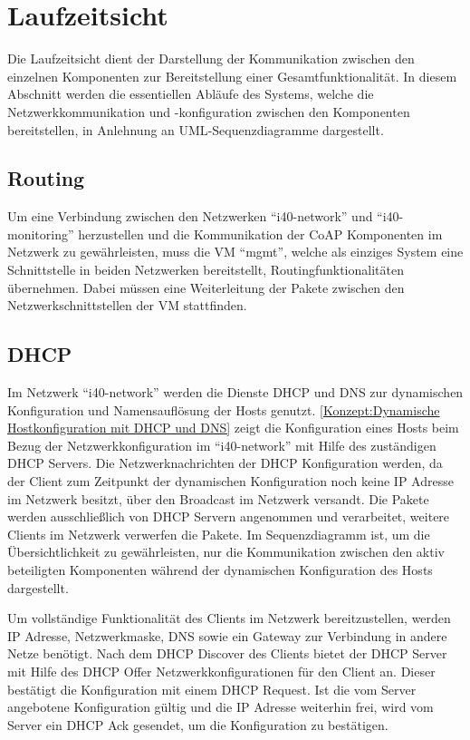 \section{Laufzeitsicht}
Die Laufzeitsicht dient der Darstellung der Kommunikation zwischen den einzelnen Komponenten zur Bereitstellung einer Gesamtfunktionalität. In diesem Abschnitt werden die essentiellen Abläufe des Systems, welche die Netzwerkkommunikation und -konfiguration zwischen den Komponenten bereitstellen, in Anlehnung an \ac{UML}-Sequenzdiagramme dargestellt.

\subsection{Routing}
Um eine Verbindung zwischen den Netzwerken "`i40-network"' und "`i40-monitoring"' herzustellen und die Kommunikation der \ac{CoAP} Komponenten im Netzwerk zu gewährleisten, muss die \ac{VM} "`mgmt"', welche als einziges System eine Schnittstelle in beiden Netzwerken bereitstellt, Routingfunktionalitäten übernehmen. Dabei müssen eine Weiterleitung der Pakete zwischen den Netzwerkschnittstellen der \ac{VM} stattfinden.

\subsection{\ac{DHCP}}
Im Netzwerk "`i40-network"' werden die Dienste \ac{DHCP} und \ac{DNS} zur dynamischen Konfiguration und Namensauflösung der Hosts genutzt. \autoref{Konzept:Dynamische Hostkonfiguration mit DHCP und DNS} zeigt die Konfiguration eines Hosts beim Bezug der Netzwerkkonfiguration im "`i40-network"' mit Hilfe des zuständigen \ac{DHCP} Servers. Die Netzwerknachrichten der \ac{DHCP} Konfiguration werden, da der Client zum Zeitpunkt der dynamischen Konfiguration noch keine \ac{IP} Adresse im Netzwerk besitzt, über den Broadcast im Netzwerk versandt. Die Pakete werden ausschließlich von \ac{DHCP} Servern angenommen und verarbeitet, weitere Clients im Netzwerk verwerfen die Pakete. Im Sequenzdiagramm ist, um die Übersichtlichkeit zu gewährleisten, nur die Kommunikation zwischen den aktiv beteiligten Komponenten während der dynamischen Konfiguration des Hosts dargestellt.

Um vollständige Funktionalität des Clients im Netzwerk bereitzustellen, werden \ac{IP} Adresse, Netzwerkmaske, \ac{DNS} sowie ein Gateway zur Verbindung in andere Netze benötigt. Nach dem \ac{DHCP} Discover des Clients bietet der \ac{DHCP} Server mit Hilfe des \ac{DHCP} Offer Netzwerkkonfigurationen für den Client an. Dieser bestätigt die Konfiguration mit einem \ac{DHCP} Request. Ist die vom Server angebotene Konfiguration gültig und die \ac{IP} Adresse weiterhin frei, wird vom Server ein \ac{DHCP} Ack gesendet, um die Konfiguration zu bestätigen.

